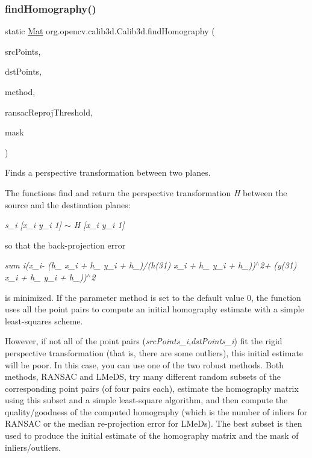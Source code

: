\subsubsection{\texorpdfstring{find\+Homography()}{findHomography()}\hspace{0.1cm}{\footnotesize\ttfamily [1/3]}}
{\footnotesize\ttfamily static \mbox{\hyperlink{classorg_1_1opencv_1_1core_1_1_mat}{Mat}} org.\+opencv.\+calib3d.\+Calib3d.\+find\+Homography (\begin{DoxyParamCaption}\item[{\mbox{\hyperlink{classorg_1_1opencv_1_1core_1_1_mat_of_point2f}{Mat\+Of\+Point2f}}}]{src\+Points,  }\item[{\mbox{\hyperlink{classorg_1_1opencv_1_1core_1_1_mat_of_point2f}{Mat\+Of\+Point2f}}}]{dst\+Points,  }\item[{int}]{method,  }\item[{double}]{ransac\+Reproj\+Threshold,  }\item[{\mbox{\hyperlink{classorg_1_1opencv_1_1core_1_1_mat}{Mat}}}]{mask }\end{DoxyParamCaption})\hspace{0.3cm}{\ttfamily [static]}}

Finds a perspective transformation between two planes.

The functions find and return the perspective transformation {\itshape H} between the source and the destination planes\+:

{\itshape s\+\_\+i \mbox{[}x\textquotesingle{}\+\_\+i y\textquotesingle{}\+\_\+i 1\mbox{]} $\sim$ H \mbox{[}x\+\_\+i y\+\_\+i 1\mbox{]}}

so that the back-\/projection error

{\itshape sum {\itshape i(x\textquotesingle{}\+\_\+i-\/ (h\+\_ x\+\_\+i + h\+\_ y\+\_\+i + h\+\_)/(h}(31) x\+\_\+i + h\+\_ y\+\_\+i + h\+\_))$^\wedge$2+ (y(31) x\+\_\+i + h\+\_ y\+\_\+i + h\+\_))$^\wedge$2}

is minimized. If the parameter {\ttfamily method} is set to the default value 0, the function uses all the point pairs to compute an initial homography estimate with a simple least-\/squares scheme.

However, if not all of the point pairs ({\itshape src\+Points\+\_\+i},{\itshape dst\+Points\+\_\+i}) fit the rigid perspective transformation (that is, there are some outliers), this initial estimate will be poor. In this case, you can use one of the two robust methods. Both methods, {\ttfamily R\+A\+N\+S\+AC} and {\ttfamily L\+Me\+DS}, try many different random subsets of the corresponding point pairs (of four pairs each), estimate the homography matrix using this subset and a simple least-\/square algorithm, and then compute the quality/goodness of the computed homography (which is the number of inliers for R\+A\+N\+S\+AC or the median re-\/projection error for L\+Me\+Ds). The best subset is then used to produce the initial estimate of the homography matrix and the mask of inliers/outliers.

